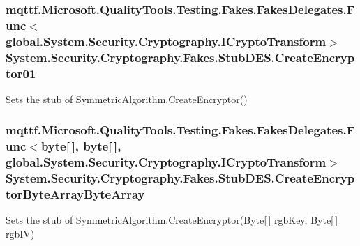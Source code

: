 \hypertarget{class_system_1_1_security_1_1_cryptography_1_1_fakes_1_1_stub_d_e_s_a5fb1dfe0e4f2898999d27b10462e9dd8}{
\subsubsection[{Create\-Encryptor01}]{\setlength{\rightskip}{0pt plus 5cm}mqttf.\-Microsoft.\-Quality\-Tools.\-Testing.\-Fakes.\-Fakes\-Delegates.\-Func$<$global.\-System.\-Security.\-Cryptography.\-I\-Crypto\-Transform$>$ System.\-Security.\-Cryptography.\-Fakes.\-Stub\-D\-E\-S.\-Create\-Encryptor01}}\label{class_system_1_1_security_1_1_cryptography_1_1_fakes_1_1_stub_d_e_s_a5fb1dfe0e4f2898999d27b10462e9dd8}


Sets the stub of Symmetric\-Algorithm.\-Create\-Encryptor()

\hypertarget{class_system_1_1_security_1_1_cryptography_1_1_fakes_1_1_stub_d_e_s_ad8578faef5d54663f244d660abb15a7d}{
\subsubsection[{Create\-Encryptor\-Byte\-Array\-Byte\-Array}]{\setlength{\rightskip}{0pt plus 5cm}mqttf.\-Microsoft.\-Quality\-Tools.\-Testing.\-Fakes.\-Fakes\-Delegates.\-Func$<$byte\mbox{[}$\,$\mbox{]}, byte\mbox{[}$\,$\mbox{]}, global.\-System.\-Security.\-Cryptography.\-I\-Crypto\-Transform$>$ System.\-Security.\-Cryptography.\-Fakes.\-Stub\-D\-E\-S.\-Create\-Encryptor\-Byte\-Array\-Byte\-Array}}\label{class_system_1_1_security_1_1_cryptography_1_1_fakes_1_1_stub_d_e_s_ad8578faef5d54663f244d660abb15a7d}


Sets the stub of Symmetric\-Algorithm.\-Create\-Encryptor(\-Byte\mbox{[}$\,$\mbox{]} rgb\-Key, Byte\mbox{[}$\,$\mbox{]} rgb\-I\-V)

